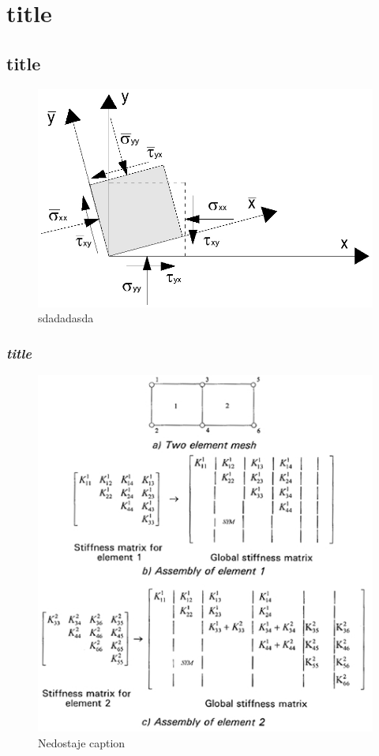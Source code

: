 \chapter{title}
\lipsum[1-3]


\section{title}

\lipsum[1-3]


\begin{figure}
	\centering
	\includegraphics[width=0.7\linewidth]{Slike/2dtrans}
	\caption{sdadadasda}
	\label{fig:2dtrans}
\end{figure}


\subsection{\textit{title}}


\lipsum[1-3]

\begin{figure}
	\centering
	\includegraphics[width=0.7\linewidth]{Slike/assembly}
	\caption{Nedostaje caption}
	\label{fig:assembly}
\end{figure}


\lipsum[1-3] \cite{Gutierrez2009,doi:10.1680/geot.1986.36.1.65,krahn}
\lipsum[1-3]